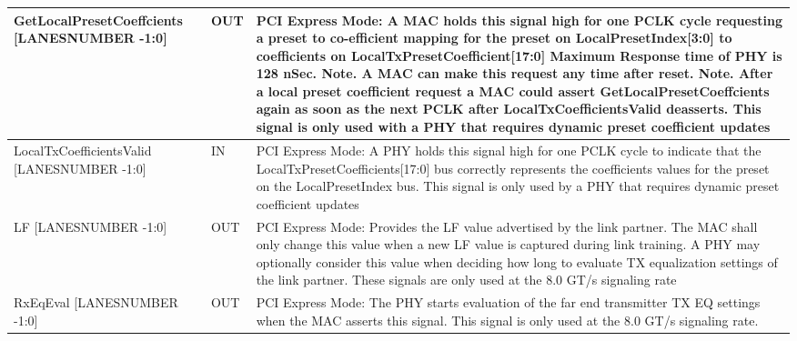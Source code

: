 \begin{table}[H]

  \centering
\begin{tabular}{ |P{60mm}|P{10mm}|m{60mm}| }

\hline
GetLocalPresetCoeffcients [LANESNUMBER -1:0] & OUT &
PCI Express Mode: \newline
A MAC holds this signal high for one PCLK
cycle requesting a preset to co-efficient
mapping for the preset on
LocalPresetIndex[3:0] to coefficients on
LocalTxPresetCoefficient[17:0]
Maximum Response time of PHY is 128 nSec.
Note. A MAC can make this request any time
after reset.\newline
Note. After a local preset coefficient request a
MAC could assert GetLocalPresetCoeffcients
again as soon as the next PCLK after
LocalTxCoefficientsValid deasserts.
\newline
This signal is only used with a PHY that
requires dynamic preset coefficient updates

\\ \hline
LocalTxCoefficientsValid [LANESNUMBER -1:0] & IN & 
PCI Express Mode: \newline
A PHY holds this signal high for one PCLK
cycle to indicate that the
LocalTxPresetCoefficients[17:0] bus correctly
represents the coefficients values for the
preset on the LocalPresetIndex bus. \newline
This signal is only used by a PHY that requires
dynamic preset coefficient updates

\\ \hline

LF [LANESNUMBER -1:0] & OUT & 
PCI Express Mode: \newline
Provides the LF value advertised by the link
partner. The MAC shall only change this value
when a new LF value is captured during link
training. A PHY may optionally consider this
value when deciding how long to evaluate TX
equalization settings of the link partner.
These signals are only used at the 8.0 GT/s
signaling rate
\\ \hline
RxEqEval [LANESNUMBER -1:0] & OUT & 
PCI Express Mode: \newline
The PHY starts evaluation of the far end
transmitter TX EQ settings when the MAC asserts
this signal.
This signal is only used at the 8.0 GT/s
signaling rate.
\\ \hline
\end{tabular}
\end{table}

